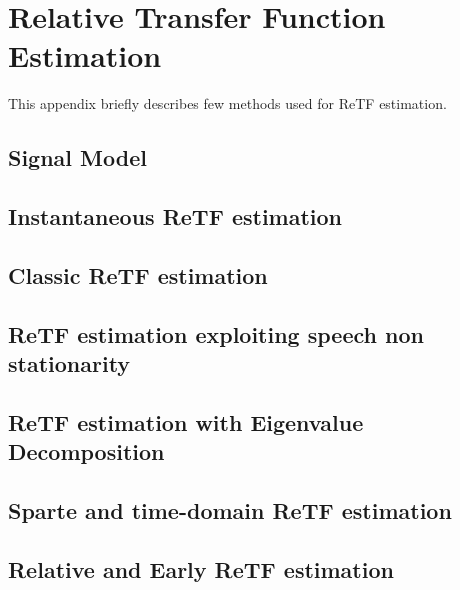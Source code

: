 \chapter{Relative Transfer Function Estimation}\label{ap:retf}

\vspace{-2.5em}
  This appendix briefly describes few methods used for \ac{ReTF} estimation.

\section{Signal Model}


\section{Instantaneous ReTF estimation}

\section{Classic ReTF estimation}

\section{ReTF estimation exploiting speech non stationarity}

\section{ReTF estimation with Eigenvalue Decomposition}

\section{Sparte and time-domain ReTF estimation}

\section{Relative and Early ReTF estimation}

